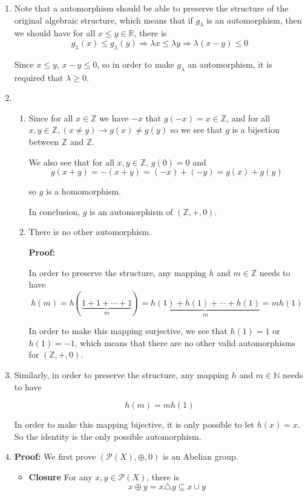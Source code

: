 \documentclass[11pt]{article}
\begin{document}
	\begin{enumerate}
		\item Note that a automorphism should be able to preserve the structure of the original algebraic structure, which means that if $g_{\lambda}$ is an automorphism, then we should have for all $x \leq y \in \mathbb{R}$, there is 
		\[g_{\lambda}(x) \leq g_{\lambda}(y) \Rightarrow \lambda x \leq \lambda y \Rightarrow \lambda (x - y) \leq 0\]
		
		Since $x \leq y$, $x - y \leq 0$, so in order to make $g_{\lambda}$ an automorphism, it is required that $\lambda \geq 0$.
		\item 
		\begin{enumerate}
			\item Since for all $x \in \mathbb{Z}$ we have $-x$ that $g(-x) = x \in \mathbb{Z}$, and for all $x, y \in \mathbb{Z}, (x \neq y) \rightarrow g(x) \neq g(y)$ so we see that $g$ is a bijection between $\mathbb{Z}$ and $\mathbb{Z}$.
			
			We also see that for all $x, y \in \mathbb{Z}$, $g(0) = 0$ and 
			\[g(x + y) = -(x + y) = (-x) + (-y) = g(x) + g(y)\]
			
			so $g$ is a homomorphism.
			
			In conclusion, $g$ is an automorphism of $(\mathbb{Z}, +,  0)$.
			\item There is no other automorphism.
			
			\textbf{Proof:}
			
			In order to preserve the structure, any mapping $h$ and $m \in \mathbb{Z}$ needs to have
			\[h(m) = h(\underbrace{1 + 1 + \cdots + 1}_{m}) = \underbrace{h(1) + h(1) + \cdots + h(1)}_{m} = mh(1)\]
			
			In order to make this mapping surjective, we see that $h(1) = 1$ or $h(1) = -1$, which means that there are no other valid automorphisms for $(\mathbb{Z}, +,  0)$.
		\end{enumerate}
		\item Similarly, in order to preserve the structure, any mapping $h$ and $m \in \mathbb{N}$ needs to have
		
			\[h(m) = mh(1)\]
			
			In order to make this mapping bijective, it is only possible to let $h(x) = x$. So the identity is the only possible automorphism.
		\item \textbf{Proof:}
			We first prove $(\mathcal{P}(X), \oplus, 0)$ is an Abelian group.
			
			\begin{itemize}
				\item \textbf{Closure}
					For any $x, y \in \mathcal{P}(X)$, there is 
				\[x \oplus y = x \triangle y \subseteq x \cup y\]
				

\end{itemize}
\end{enumerate}
\end{document}
